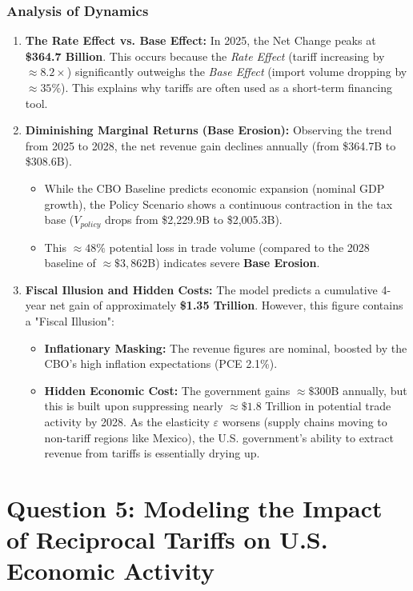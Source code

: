 \documentclass{apmcmthesis}
\begin{document}
\subsubsection{Analysis of Dynamics}
\begin{enumerate}
    \item \textbf{The Rate Effect vs. Base Effect:} 
    In 2025, the Net Change peaks at \textbf{\$364.7 Billion}. This occurs because the \textit{Rate Effect} (tariff increasing by $\approx 8.2\times$) significantly outweighs the \textit{Base Effect} (import volume dropping by $\approx 35\%$). This explains why tariffs are often used as a short-term financing tool.

    \item \textbf{Diminishing Marginal Returns (Base Erosion):}
    Observing the trend from 2025 to 2028, the net revenue gain declines annually (from \$364.7B to \$308.6B).
    \begin{itemize}
        \item While the CBO Baseline predicts economic expansion (nominal GDP growth), the Policy Scenario shows a continuous contraction in the tax base ($V_{policy}$ drops from \$2,229.9B to \$2,005.3B).
        \item This $\approx 48\%$ potential loss in trade volume (compared to the 2028 baseline of $\approx \$3,862$B) indicates severe \textbf{Base Erosion}.
    \end{itemize}

    \item \textbf{Fiscal Illusion and Hidden Costs:}
    The model predicts a cumulative 4-year net gain of approximately \textbf{\$1.35 Trillion}. However, this figure contains a "Fiscal Illusion":
    \begin{itemize}
        \item \textbf{Inflationary Masking:} The revenue figures are nominal, boosted by the CBO's high inflation expectations (PCE 2.1\%).
        \item \textbf{Hidden Economic Cost:} The government gains $\approx \$300$B annually, but this is built upon suppressing nearly $\approx \$1.8$ Trillion in potential trade activity by 2028. As the elasticity $\varepsilon$ worsens (supply chains moving to non-tariff regions like Mexico), the U.S. government's ability to extract revenue from tariffs is essentially drying up.
    \end{itemize}
\end{enumerate}


\newpage
\section*{Question 5: Modeling the Impact of Reciprocal Tariffs on U.S. Economic Activity}
\end{document}
